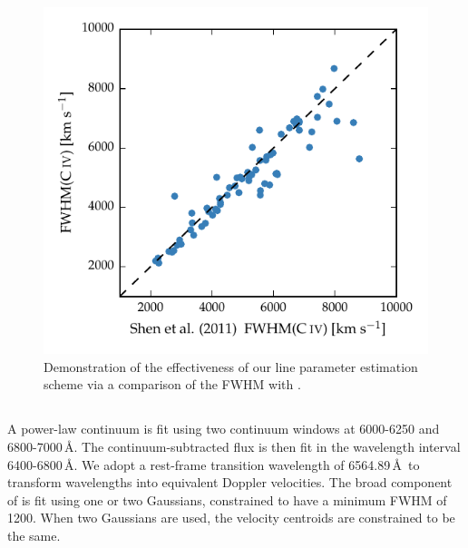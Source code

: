 \begin{figure}
    \centering 
    \includegraphics[width=0.8\linewidth]{figures/chapter03/shen_comparison_civ.pdf} 
    \caption{Demonstration of the effectiveness of our line parameter estimation scheme via a comparison of the  FWHM with \citet{shen11}.} 
    \label{fig:shen_comparison_civ}
\end{figure}

\subsection{\ha}

A power-law continuum is fit using two continuum windows at 6000-6250 and 6800-7000\,\AA. 
The continuum-subtracted flux is then fit in the wavelength interval 6400-6800\,\AA. 
We adopt a rest-frame transition wavelength of 6564.89\,\AA\, to transform wavelengths into equivalent Doppler velocities. 
The broad component of \ha is fit using one or two Gaussians, constrained to have a minimum FWHM of 1200\kms. When two Gaussians are used, the velocity centroids are constrained to be the same.


